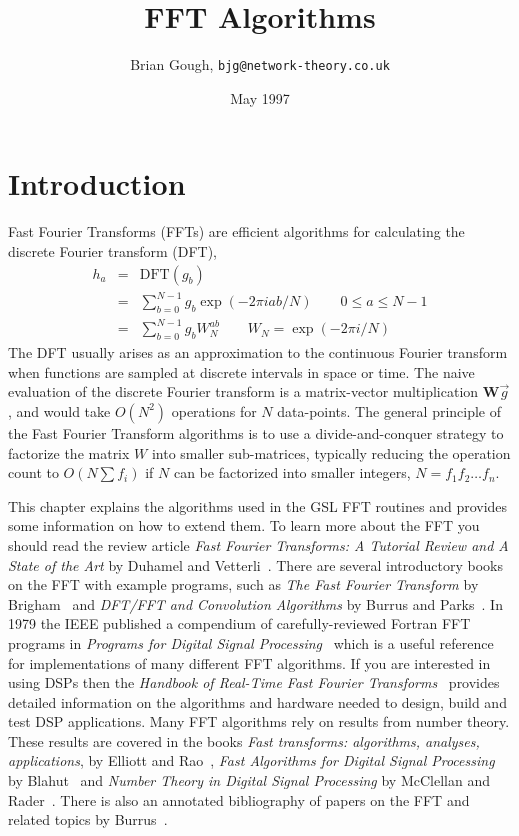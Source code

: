 \documentclass[fleqn,12pt]{article}
\begin{document}
\title{FFT Algorithms}
\author{Brian Gough, {\tt bjg@network-theory.co.uk}}
\date{May 1997}
\maketitle

\section{Introduction}

Fast Fourier Transforms (FFTs) are efficient algorithms for
calculating the discrete Fourier transform (DFT),
%
\begin{eqnarray}
h_a &=& \mathrm{DFT}(g_b) \\
    &=& \sum_{b=0}^{N-1} g_b \exp(-2\pi i a b /N) \qquad 0 \leq a \leq N-1\\
    &=& \sum_{b=0}^{N-1} g_b W_N^{ab} \qquad W_N= \exp(-2\pi i/N)
\end{eqnarray}
%
The DFT usually arises as an approximation to the continuous Fourier
transform when functions are sampled at discrete intervals in space or
time. The naive evaluation of the discrete Fourier transform is a
matrix-vector multiplication ${\mathbf W}\vec{g}$, and would take
$O(N^2)$ operations for $N$ data-points. The general principle of the
Fast Fourier Transform algorithms is to use a divide-and-conquer
strategy to factorize the matrix $W$ into smaller sub-matrices,
typically reducing the operation count to $O(N \sum f_i)$ if $N$ can
be factorized into smaller integers, $N=f_1 f_2 \dots f_n$.

This chapter explains the algorithms used in the GSL FFT routines
and provides some information on how to extend them. To learn more about
the FFT you should read the review article {\em Fast Fourier
Transforms: A Tutorial Review and A State of the Art} by Duhamel and
Vetterli~\cite{duhamel90}. There are several introductory books on the
FFT with example programs, such as {\em The Fast Fourier Transform} by
Brigham~\cite{brigham74} and {\em DFT/FFT and Convolution Algorithms}
by Burrus and Parks~\cite{burrus84}. In 1979 the IEEE published a
compendium of carefully-reviewed Fortran FFT programs in {\em Programs
for Digital Signal Processing}~\cite{committee79} which is a useful
reference for implementations of many different FFT algorithms. If you
are interested in using DSPs then the {\em Handbook of Real-Time Fast
Fourier Transforms}~\cite{smith95} provides detailed information on
the algorithms and hardware needed to design, build and test DSP
applications. Many FFT algorithms rely on results from number theory.
These results are covered in the books {\em Fast transforms:
algorithms, analyses, applications}, by Elliott and
Rao~\cite{elliott82}, {\em Fast Algorithms for Digital Signal
Processing} by Blahut~\cite{blahut} and {\em Number Theory in Digital
Signal Processing} by McClellan and Rader~\cite{mcclellan79}. There is
also an annotated bibliography of papers on the FFT and related topics
by Burrus~\cite{burrus-note}.
\end{document}
